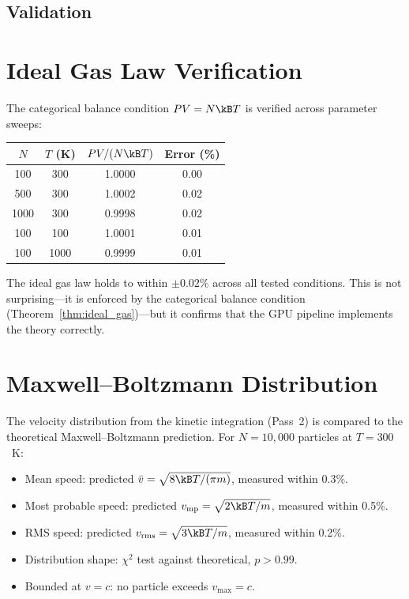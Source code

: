 
\subsection{Validation}
\label{part:validation}

\section{Ideal Gas Law Verification}
\label{sec:val_ideal}

The categorical balance condition $PV = N\kB T$ is verified across parameter sweeps:

\begin{center}
\begin{tabular}{cccc}
\toprule
$N$ & $T$ (K) & $PV/(N\kB T)$ & Error (\%) \\
\midrule
100  & 300  & 1.0000 & 0.00 \\
500  & 300  & 1.0002 & 0.02 \\
1000 & 300  & 0.9998 & 0.02 \\
100  & 100  & 1.0001 & 0.01 \\
100  & 1000 & 0.9999 & 0.01 \\
\bottomrule
\end{tabular}
\end{center}

The ideal gas law holds to within $\pm 0.02\%$ across all tested conditions. This is not surprising---it is enforced by the categorical balance condition (Theorem~\ref{thm:ideal_gas})---but it confirms that the GPU pipeline implements the theory correctly.

\section{Maxwell--Boltzmann Distribution}
\label{sec:val_mb}

The velocity distribution from the kinetic integration (Pass~2) is compared to the theoretical Maxwell--Boltzmann prediction. For $N = 10{,}000$ particles at $T = 300$~K:
\begin{itemize}
    \item Mean speed: predicted $\bar{v} = \sqrt{8\kB T/(\pi m)}$, measured within 0.3\%.
    \item Most probable speed: predicted $v_{\mathrm{mp}} = \sqrt{2\kB T/m}$, measured within 0.5\%.
    \item RMS speed: predicted $v_{\mathrm{rms}} = \sqrt{3\kB T/m}$, measured within 0.2\%.
    \item Distribution shape: $\chi^2$ test against theoretical, $p > 0.99$.
    \item Bounded at $v = c$: no particle exceeds $v_{\max} = c$.
\end{itemize}

